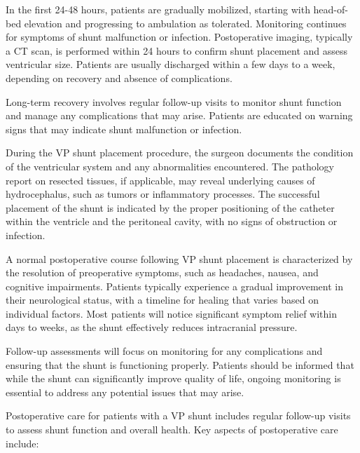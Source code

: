 In the first 24-48 hours, patients are gradually mobilized, starting with head-of-bed elevation and progressing to ambulation as tolerated. Monitoring continues for symptoms of shunt malfunction or infection. Postoperative imaging, typically a CT scan, is performed within 24 hours to confirm shunt placement and assess ventricular size. Patients are usually discharged within a few days to a week, depending on recovery and absence of complications.

Long-term recovery involves regular follow-up visits to monitor shunt function and manage any complications that may arise. Patients are educated on warning signs that may indicate shunt malfunction or infection.

During the VP shunt placement procedure, the surgeon documents the condition of the ventricular system and any abnormalities encountered. The pathology report on resected tissues, if applicable, may reveal underlying causes of hydrocephalus, such as tumors or inflammatory processes. The successful placement of the shunt is indicated by the proper positioning of the catheter within the ventricle and the peritoneal cavity, with no signs of obstruction or infection.

A normal postoperative course following VP shunt placement is characterized by the resolution of preoperative symptoms, such as headaches, nausea, and cognitive impairments. Patients typically experience a gradual improvement in their neurological status, with a timeline for healing that varies based on individual factors. Most patients will notice significant symptom relief within days to weeks, as the shunt effectively reduces intracranial pressure.

Follow-up assessments will focus on monitoring for any complications and ensuring that the shunt is functioning properly. Patients should be informed that while the shunt can significantly improve quality of life, ongoing monitoring is essential to address any potential issues that may arise.

Postoperative care for patients with a VP shunt includes regular follow-up visits to assess shunt function and overall health. Key aspects of postoperative care include:

